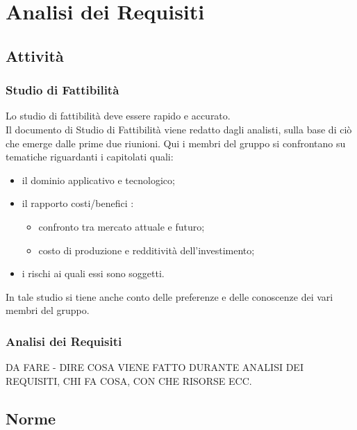\section{Analisi dei Requisiti}
	\subsection{Attività}
		\subsubsection{Studio di Fattibilità}
			Lo studio di fattibilità deve essere rapido e accurato.\\
			Il documento di Studio di Fattibilità viene redatto dagli analisti, sulla base di ciò che emerge dalle prime due riunioni. Qui i membri del gruppo si confrontano su tematiche riguardanti i capitolati quali:
			\begin{itemize}
				\item il dominio applicativo e tecnologico;
				\item il rapporto costi/benefici :
				\begin{itemize}
					\item confronto tra mercato attuale e futuro;
					\item costo di produzione e redditività dell'investimento;
				\end{itemize}
			\item i rischi ai quali essi sono soggetti.
			\end{itemize}
			In tale studio si tiene anche conto delle preferenze e delle conoscenze dei vari membri del gruppo.
		\subsubsection{Analisi dei Requisiti}
			DA FARE - DIRE COSA VIENE FATTO DURANTE ANALISI DEI REQUISITI, CHI FA COSA, CON CHE RISORSE ECC.
	\subsection{Norme}
